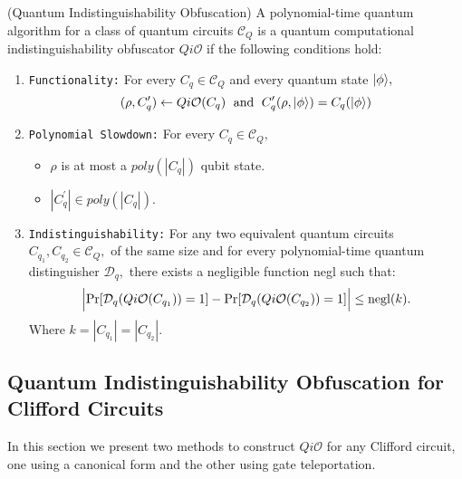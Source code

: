 \begin{definition}{\rm (Quantum Indistinguishability Obfuscation)}
\label{def:QiO}
A  polynomial-time quantum algorithm for a class of quantum circuits $\mathcal{C}_Q$ is a quantum computational indistinguishability obfuscator $Qi\mathcal{O}$  if the following conditions hold:

\begin{enumerate}
\item {\tt Functionality:}  For every $C_q\in \mathcal{C}_Q$ and every quantum state ${\lvert}\phi\rangle,$
$$(\rho, C_q^\prime)\leftarrow Qi\mathcal{O}(C_q) \;  \mbox{ and }\; C_q^\prime(\rho,{\lvert}\phi\rangle)=C_{q}({\lvert}\phi\rangle)$$
											

\item  {\tt Polynomial Slowdown:}  For every $C_{q}\in \mathcal{C}_Q,$
\begin{itemize}
\item  $\rho$ is at most a $poly(|C_{q}|)$ qubit state.
\item $|C_{q}^\prime| \in poly(|C_{q}|).$
\end{itemize}

\item {\tt Indistinguishability:} For any two equivalent quantum circuits $C_{q_1},C_{q_2}\in \mathcal{C}_Q,$ of the same size
 and for every polynomial-time quantum distinguisher $\mathcal{D}_q,$ there exists a negligible function {\rm negl} such that:
					$$\Big |{\rm Pr}[\mathcal{D}_q(Qi\mathcal{O}(C_{q_1}))=1]-{\rm Pr}[\mathcal{D}_q(Qi\mathcal{O}(C_{q_2}))=1] \Big |\leq  {\rm negl}(k).$$		
Where $k=|C_{q_1}|=|C_{q_2}|.$						
\end{enumerate}
\end{definition}


\subsection{Quantum Indistinguishability Obfuscation for Clifford Circuits}
\label{QiO:Clifford-Circuits}
 In this section we present two methods to construct $Qi\mathcal{O}$ for any Clifford circuit,  one using a canonical form and the other using gate teleportation.

